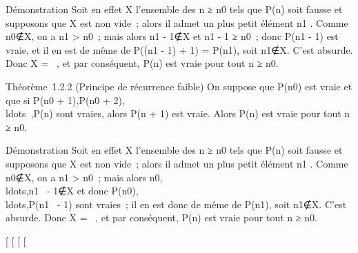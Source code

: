 Démonstration Soit en effet X l'ensemble des n ≥ n0 tels que
P(n) soit fausse et supposons que X est non vide~; alors il admet un
plus petit élément n1 \inX. Comme
n0∉X, on a n1
\textgreater{} n0~; mais alors n1 -
1∉X et n1 - 1 ≥ n0~; donc
P(n1 - 1) est vraie, et il en est de même de P((n1 -
1) + 1) = P(n1), soit
n1∉X. C'est absurde. Donc X = \varnothing~, et
par conséquent, P(n) est vraie pour tout n ≥ n0.

Théorème~1.2.2 (Principe de récurrence faible) On suppose que
P(n0) est vraie et que si P(n0 + 1),P(n0 +
2),\\ldots~,P(n)
sont vraies, alors P(n + 1) est vraie. Alors P(n) est vraie pour tout n
≥ n0.

Démonstration Soit en effet X l'ensemble des n ≥ n0 tels que
P(n) soit fausse et supposons que X est non vide~; alors il admet un
plus petit élément n1 \inX. Comme
n0∉X, on a n1
\textgreater{} n0~; mais alors
n0,\\ldots,n1~
- 1∉X et donc
P(n0),\\ldots,P(n1~
- 1) sont vraies~; il en est donc de même de P(n1), soit
n1∉X. C'est absurde. Donc X = \varnothing~, et
par conséquent, P(n) est vraie pour tout n ≥ n0.

{[}
{[}
{[}
{[}
